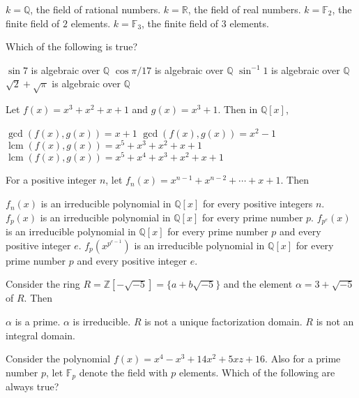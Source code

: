 \documentclass[10pt]{exam}
\DeclareMathOperator{\lcm}{\text{lcm}}
\begin{document}
\begin{questions}
\begin{checkboxes}
\choice $k=\mathbb{Q}$, the field of rational numbers. 
\choice $k=\mathbb{R}$, the field of real numbers. 
\choice $k=\mathbb{F}_2$, the finite field of $2$ elements. 
\choice $k=\mathbb{F}_3$, the finite field of $3$ elements. 
\end{checkboxes}

\question
Which of the following is true?

\begin{checkboxes}
\choice $\sin 7$ is algebraic over $\mathbb{Q}$
\choice $\cos \pi/17$ is algebraic over $\mathbb{Q}$
\choice $\sin^{-1} 1$ is algebraic over $\mathbb{Q}$
\choice $\sqrt{2}+\sqrt{\pi}$ is algebraic over $\mathbb{Q}$
\end{checkboxes}

\question
Let $f(x)=x^3+x^2+x+1$ and $g(x)=x^3+1$. Then in $\mathbb{Q}[x]$,

\begin{checkboxes}
\choice $\gcd(f(x),g(x))=x+1$
\choice $\gcd(f(x),g(x))=x^2-1$
\choice $\lcm(f(x),g(x))=x^5+x^3+x^2+x+1$
\choice $\lcm(f(x),g(x))=x^5+x^4+x^3+x^2+x+1$
\end{checkboxes}


\question
For a positive integer $n$, let $f_n(x)=x^{n-1}+x^{n-2}+\cdots +x+1$. Then\textbf{\emph{\textbf{}}}

\begin{checkboxes}
\choice $f_n(x)$ is an irreducible polynomial in $\mathbb{Q}[x]$ for every positive integers $n$.
\choice $f_p(x)$ is an irreducible polynomial in $\mathbb{Q}[x]$ for every prime number $p$.
\choice $f_{p^e}(x)$ is an irreducible polynomial in $\mathbb{Q}[x]$ for every prime number $p$ and every positive integer $e$.
\choice $f_{p}(x^{p^{e-1}})$ is an irreducible polynomial in $\mathbb{Q}[x]$ for every prime number $p$ and every positive integer $e$.
\end{checkboxes}

\question
Consider the ring $R=\mathbb{Z}[-\sqrt{-5}]=\{a+b\sqrt{-5}\}$ and the element $\alpha=3+\sqrt{-5}$ of $R$. Then
\begin{checkboxes}
\choice $\alpha$ is a prime.
\choice $\alpha$ is irreducible.
\choice $R$ is not a unique factorization domain.
\choice $R$ is not an integral domain.
\end{checkboxes}

\question
Consider the polynomial $f(x)=x^4-x^3+14x^2+5xz+16$. Also for a prime number $p$, let $\mathbb{F}_p$ denote the field with $p$ elements. Which of the following are always true?


\end{questions}
\end{document}
